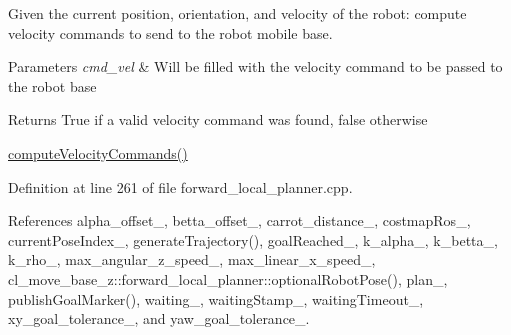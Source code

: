 Given the current position, orientation, and velocity of the robot\+: compute velocity commands to send to the robot mobile base. 


\begin{DoxyParams}{Parameters}
{\em cmd\+\_\+vel} & Will be filled with the velocity command to be passed to the robot base \\
\hline
\end{DoxyParams}
\begin{DoxyReturn}{Returns}
True if a valid velocity command was found, false otherwise
\end{DoxyReturn}
\hyperlink{classcl__move__base__z_1_1forward__local__planner_1_1ForwardLocalPlanner_a1b87a4f9f107c7727c155c4afcb90700}{compute\+Velocity\+Commands()} 

Definition at line 261 of file forward\+\_\+local\+\_\+planner.\+cpp.



References alpha\+\_\+offset\+\_\+, betta\+\_\+offset\+\_\+, carrot\+\_\+distance\+\_\+, costmap\+Ros\+\_\+, current\+Pose\+Index\+\_\+, generate\+Trajectory(), goal\+Reached\+\_\+, k\+\_\+alpha\+\_\+, k\+\_\+betta\+\_\+, k\+\_\+rho\+\_\+, max\+\_\+angular\+\_\+z\+\_\+speed\+\_\+, max\+\_\+linear\+\_\+x\+\_\+speed\+\_\+, cl\+\_\+move\+\_\+base\+\_\+z\+::forward\+\_\+local\+\_\+planner\+::optional\+Robot\+Pose(), plan\+\_\+, publish\+Goal\+Marker(), waiting\+\_\+, waiting\+Stamp\+\_\+, waiting\+Timeout\+\_\+, xy\+\_\+goal\+\_\+tolerance\+\_\+, and yaw\+\_\+goal\+\_\+tolerance\+\_\+.


